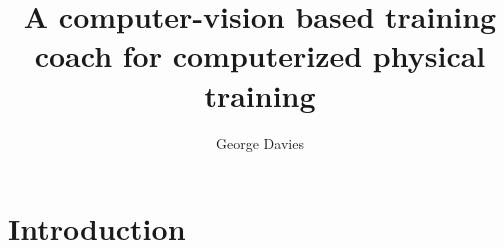 \documentclass[runningheads]{llncs}
\begin{document}
%
\title{A computer-vision based training coach for computerized physical training}
%
%
\author{George Davies}
%
%
%
\maketitle              %
%

\section{Introduction}
\end{document}
